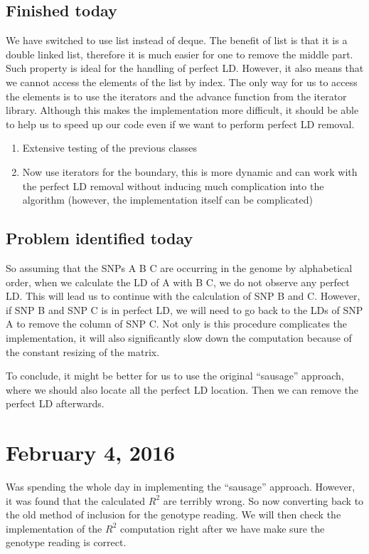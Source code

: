 \documentclass[12pt]{article}
\begin{document}
	\subsection{Finished today}
	We have switched to use list instead of deque. 
	The benefit of list is that it is a double linked list, therefore it is much easier for one to remove the middle part.
	Such property is ideal for the handling of perfect LD. 
	However, it also means that we cannot access the elements of the list by index. 
	The only way for us to access the elements is to use the iterators and the advance function from the iterator library.
	Although this makes the implementation more difficult, it should be able to help us to speed up our code even if we want to perform perfect LD removal.
	\begin{enumerate}
		\item Extensive testing of the previous classes
		\item Now use iterators for the boundary, this is more dynamic and can work with the perfect LD removal without inducing much complication into the algorithm (however, the implementation itself can be complicated)
	\end{enumerate}
	\subsection{Problem identified today}
	So assuming that the SNPs A B C are occurring in the genome by alphabetical order, when we calculate the LD of A with B C, we do not observe any perfect LD. 
	This will lead us to continue with the calculation of SNP B and C. 
	However, if SNP B and SNP C is in perfect LD, we will need to go back to the LDs of SNP A to remove the column of SNP C.
	Not only is this procedure complicates the implementation, it will also significantly slow down the computation because of the constant resizing of the matrix.
	
	To conclude, it might be better for us to use the original ``sausage'' approach, where we should also locate all the perfect LD location.
	Then we can remove the perfect LD afterwards.
	
	\section{February 4, 2016}
	Was spending the whole day in implementing the ``sausage'' approach.
	However, it was found that the calculated $R^2$ are terribly wrong. 
	So now converting back to the old method of inclusion for the genotype reading.
	We will then check the implementation of the $R^2$ computation right after we have make sure the genotype reading is correct.
\end{document}
